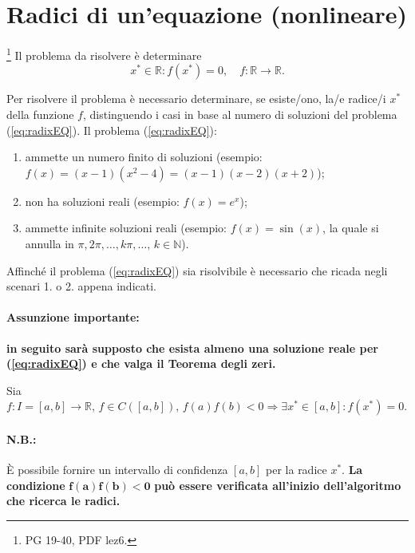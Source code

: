 \section{Radici di un'equazione (nonlineare)}
\footnote{PG 19-40, PDF lez6.} Il problema da risolvere è determinare
\begin{equation} \label{eq:radixEQ}
	x^*\in \mathbb R : f(x^*)=0,\quad f:\mathbb R\rightarrow \mathbb R.
\end{equation}

Per risolvere il problema è necessario determinare, se esiste/ono, la/e radice/i $x^*$ della funzione $f$, distinguendo i casi in base al numero di soluzioni del problema (\ref{eq:radixEQ}). Il problema (\ref{eq:radixEQ}):
\begin{enumerate} 
	\item ammette un numero finito di soluzioni (esempio: $f(x)=(x-1)(x^2-4)=(x-1)(x-2)(x+2)$);
	\item non ha soluzioni reali (esempio: $f(x)=e^x$);
	\item ammette infinite soluzioni reali (esempio: $f(x)=\sin(x)$, la quale si annulla in $\pi, 2\pi, \dots, k\pi, \dots,\, k\in\mathbb N$).
\end{enumerate}
Affinché il problema (\ref{eq:radixEQ}) sia risolvibile è necessario che ricada negli scenari 1. o 2. appena indicati.

\paragraph{Assunzione importante:} \textbf{in seguito sarà supposto che esista almeno una soluzione reale per (\ref{eq:radixEQ}) e che valga il Teorema degli zeri.} 

\begin{theorem}
	Sia $f\colon I=[a,b]\rightarrow\mathbb R,\, f\in C([a,b]),\, f(a)f(b)< 0 \Rightarrow\exists x^* \in [a,b]:f(x^*)=0$.
\end{theorem}
\paragraph{N.B.:} È possibile fornire un intervallo di confidenza $[a,b]$ per la radice $x^*$. \textbf{La condizione} $\boldsymbol{f(a)f(b) < 0}$ \textbf{può essere verificata all'inizio dell'algoritmo che ricerca le radici.}

\addtocounter{footnote}{-1}


